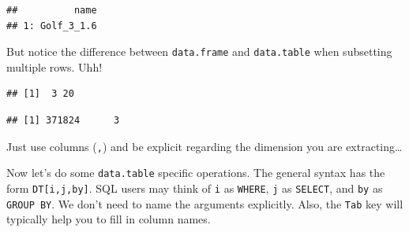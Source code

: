 \documentclass[]{book}
\newenvironment{Shaded}{\begin{snugshade}}{\end{snugshade}}
\newcommand{\CommentTok}[1]{\textcolor[rgb]{0.56,0.35,0.01}{\textit{#1}}}
\newcommand{\DecValTok}[1]{\textcolor[rgb]{0.00,0.00,0.81}{#1}}
\newcommand{\KeywordTok}[1]{\textcolor[rgb]{0.13,0.29,0.53}{\textbf{#1}}}
\newcommand{\NormalTok}[1]{#1}
\newcommand{\OperatorTok}[1]{\textcolor[rgb]{0.81,0.36,0.00}{\textbf{#1}}}
\newcommand{\StringTok}[1]{\textcolor[rgb]{0.31,0.60,0.02}{#1}}
\theoremstyle{definition}
\theoremstyle{definition}
\theoremstyle{definition}
\theoremstyle{remark}
\begin{document}
\begin{Shaded}
\end{Shaded}

\begin{verbatim}
##          name
## 1: Golf_3_1.6
\end{verbatim}

But notice the difference between \texttt{data.frame} and \texttt{data.table} when subsetting multiple rows. Uhh!

\begin{Shaded}
\end{Shaded}

\begin{verbatim}
## [1]  3 20
\end{verbatim}

\begin{Shaded}
\end{Shaded}

\begin{verbatim}
## [1] 371824      3
\end{verbatim}

Just use columns (\texttt{,}) and be explicit regarding the dimension you are extracting\ldots{}

Now let's do some \texttt{data.table} specific operations.
The general syntax has the form \texttt{DT{[}i,j,by{]}}.
SQL users may think of \texttt{i} as \texttt{WHERE}, \texttt{j} as \texttt{SELECT}, and \texttt{by} as \texttt{GROUP\ BY}.
We don't need to name the arguments explicitly.
Also, the \texttt{Tab} key will typically help you to fill in column names.

\begin{Shaded}
\end{Shaded}
\end{document}

